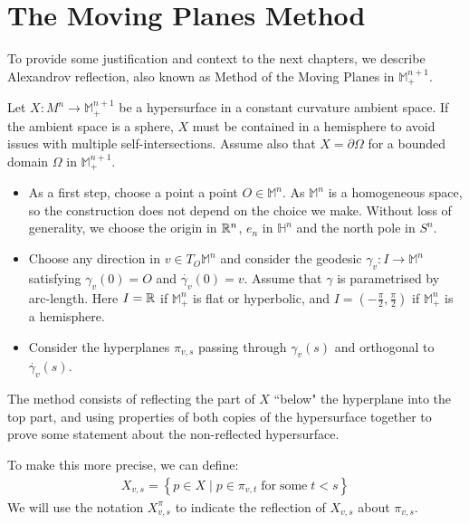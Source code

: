 \section{The Moving Planes Method}
\label{method moving planes}

To provide some justification and context to the next chapters, we describe Alexandrov reflection, also known as Method of the Moving Planes in $\mathbb{M}^{n+1}_+$.  

Let $X:M^n\rightarrow \mathbb{M}^{n+1}_+$ be a hypersurface in a constant curvature ambient space. If the ambient space is a sphere, $X$ must be contained in a hemisphere to avoid issues with multiple self-intersections. Assume also that $X=\partial\Omega$ for a bounded domain $\Omega$ in $\mathbb{M}^{n+1}_+$. 
\begin{itemize}	
	\item As a first step, choose a point a point $O \in \mathbb{M}^n$. As $\mathbb{M}^n$ is a homogeneous space, so the construction does not depend on the choice we make. Without loss of generality, we choose the origin in $\mathbb{R}^n$, $e_n$ in $\mathbb{H}^n$ and the north pole in $S^n$. 
	\item Choose any direction in $v\in T_O\mathbb{M}^n$ and consider the geodesic $\gamma_v: I \rightarrow \mathbb{M}^n$ satisfying $\gamma_v (0) = O$ and $\dot{\gamma_v} (0) = v$. Assume that $\gamma$ is parametrised by arc-length. Here $I=\mathbb{R}$ if $\mathbb{M}^n_+$ is flat or hyperbolic, and  $I=(-\frac{\pi}{2}, \frac{\pi}{2})$ if $\mathbb{M}^n_+$ is a hemisphere.
	\item Consider the hyperplanes $\pi_{v, s}$ passing through $\gamma_v(s)$ and orthogonal to  $\dot{\gamma_v}(s)$.
\end{itemize}
The method consists of reflecting the part of $X$ ``below" the hyperplane into the top part, and using properties of both copies of the hypersurface together to prove some statement about the non-reflected hypersurface. 

To make this more precise, we can define: 
\begin{align*}
	X_{v, s} = \left\{p \in X \;|\; p\in \pi_{v, t} \; \mathrm{ for \; some }\; t < s\right\}
\end{align*}
We will use the notation $X_{v, s}^\pi$ to indicate the reflection of $X_{v, s}$ about $\pi_{v, s}$. 

